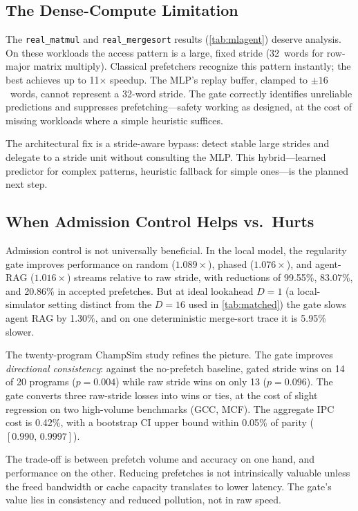 \documentclass[conference]{IEEEtran}
\begin{document}
\subsection{The Dense-Compute Limitation}

The \texttt{real\_matmul} and \texttt{real\_mergesort} results
(\cref{tab:mlagent}) deserve analysis. On these workloads the access
pattern is a large, fixed stride (32~words for row-major matrix multiply).
Classical prefetchers recognize this pattern instantly; the best
achieves up to 11$\times$ speedup. The MLP's replay buffer, clamped to ${\pm}16$~words,
cannot represent a 32-word stride. The gate correctly identifies unreliable
predictions and suppresses prefetching---safety working as designed, at the
cost of missing workloads where a simple heuristic suffices.

The architectural fix is a stride-aware bypass: detect stable large strides
and delegate to a stride unit without consulting the MLP. This
hybrid---learned predictor for complex patterns, heuristic fallback for
simple ones---is the planned next step.

\subsection{When Admission Control Helps vs.\ Hurts}

Admission control is not universally beneficial. In the local model, the
regularity gate improves performance on random ($1.089\times$), phased
($1.076\times$), and agent-RAG ($1.016\times$) streams relative to raw
stride, with reductions of 99.55\%, 83.07\%, and 20.86\% in accepted
prefetches. But at ideal lookahead $D = 1$ (a local-simulator setting distinct
from the $D = 16$ used in \cref{tab:matched}) the gate slows agent RAG by
1.30\%, and on one deterministic merge-sort trace it is 5.95\% slower.

The twenty-program ChampSim study refines the picture. The gate improves
\emph{directional consistency}: against the no-prefetch baseline, gated
stride wins on 14 of 20 programs ($p = 0.004$) while raw stride wins on
only 13 ($p = 0.096$). The gate converts three raw-stride losses into wins
or ties, at the cost of slight regression on two high-volume benchmarks
(GCC, MCF). The aggregate IPC cost is 0.42\%, with a bootstrap CI upper bound
within 0.05\% of parity ($[0.990,\,0.9997]$).

The trade-off is between prefetch volume and accuracy on one hand, and
performance on the other. Reducing prefetches is not intrinsically valuable
unless the freed bandwidth or cache capacity translates to lower latency.
The gate's value lies in consistency and reduced pollution, not in raw speed.
\end{document}
